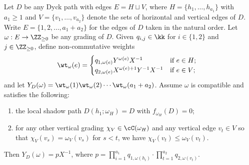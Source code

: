 \begin{proposition}
 \label{prop:noncommutative collapse}
 Let $D$ be any Dyck path with edges $E=H\sqcup V$, where $H=\{h_1,\ldots,h_{a_1}\}$ with $a_1\ge1$ and $V=\{v_1,\ldots,v_{a_2}\}$ denote the sets of horizontal and vertical edges of $D$. 
 Write $E=\{1,2,\ldots,a_1+a_2\}$ for the edges of $D$ taken in the natural order.
 Let $\omega:E\to\ZZ_{\ge0}$ be any grading of $D$.
 Given $q_{i,j}\in\kk$ for $i\in\{1,2\}$ and $j\in\ZZ_{\ge0}$, define non-commutative weights
 \begin{equation}
 \label{eq:general edge weights}
 \wt_\omega(e)=\begin{cases}
 q_{1,\omega(e)}Y^{\omega(e)}X^{-1} & \text{if $e\in H$;}\\
 q_{2,\omega(e)}X^{\omega(e)+1}Y^{-1}X^{-1} & \text{if $e\in V$;}\\
 \end{cases}
 \end{equation}
 and let $Y_D(\omega)=\wt_\omega(1)\wt_\omega(2)\cdots\wt_\omega(a_1+a_2)$.
 Assume $\omega$ is compatible and satisfies the following:
 \begin{enumerate}
 \item\label{prop4.1_1} the local shadow path $D(h_1;\omega_H)=D$ with $f_{\omega_H}(D)=0$;
 \item\label{prop4.1_2} for any other vertical grading $\chi_V\in\cC(\omega_H)$ and any vertical edge $v_t\in V$ so that $\chi_V(v_s)=\omega_V(v_s)$ for $s<t$, we have $\chi_V(v_t)\le\omega_V(v_t)$.
 \end{enumerate}
 Then $Y_D(\omega)=pX^{-1}$, where $p=\prod_{i=1}^{a_1}q_{1,\omega(h_i)}\cdot\prod_{t=1}^{a_2}q_{2,\omega(v_t)}$.
\end{proposition}
